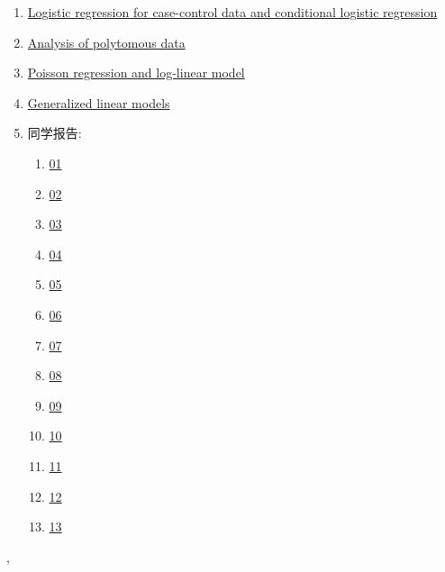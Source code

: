 \documentclass[11pt]{article}
\renewcommand{\today}{\shortmonthname[\the\month] \the \day,  \the\year}
\begin{document}
\begin{enumerate}
	\item \href{https://mp.weixin.qq.com/s/W159WsfV-EgqbGay22e_Wg}{Logistic regression for case-control data and conditional logistic regression}	%
	\item \href{https://mp.weixin.qq.com/s/Qba7J4eg6gLmx-U1O0EUIQ}{Analysis of polytomous data}	%
	\item \href{https://mp.weixin.qq.com/s/ml-xfUMtkioFPNJI30fetQ}{Poisson regression and log-linear model}	%
	\item \href{https://mp.weixin.qq.com/s/ak4rzd7MhRNk7PWp1WwxsQ}{Generalized linear models}	%
	\item 同学报告:
	\vspace{-0.25cm}
	\begin{multicols}{7}
		\begin{enumerate}
			\item \href{https://mp.weixin.qq.com/s/VcDztAmrOP3kR371QlMUSA}{01}	%
			\item \href{https://mp.weixin.qq.com/s/Ej1jEF-qKacFCb6EAX0JAw}{02}	%
			\item \href{https://mp.weixin.qq.com/s/MTZu1n6WEOYSGjZqnKPodA}{03}	%
			\item \href{https://mp.weixin.qq.com/s/Ovcd-0bm1ijOXPyn5OmmHA}{04}	%
			\item \href{https://mp.weixin.qq.com/s/-24IZomVKA39-PUP4fELzw}{05}	%
			\item \href{https://mp.weixin.qq.com/s/OtqAtzYVX52tU8JulqLOLg}{06}	%
			\item \href{https://mp.weixin.qq.com/s/zFdUWWkTQHKxXPqosTptiQ}{07}	%
			\item \href{https://mp.weixin.qq.com/s/5x1hvAFwDcBRaW_T0JtWRA}{08}	%
			\item \href{https://mp.weixin.qq.com/s/gD8t70nfqdGrRvid906S9w}{09}	%
			\item \href{https://mp.weixin.qq.com/s/hi5fUMEkMbduMCBG81RNDQ}{10}	%
			\item \href{https://mp.weixin.qq.com/s/q-NA91RBFrGiG51EqQgl7A}{11}	%
			\item \href{https://mp.weixin.qq.com/s/ok-oypG0TC-R1M1zVWQ2wg}{12}	%
			\item \href{https://mp.weixin.qq.com/s/TF1Ox4zLf9hw4BFer9TZDQ}{13}	%
		\end{enumerate}
	\end{multicols}
\end{enumerate}







%
\begin{flushright}
	\tiny \today 
\end{flushright}
\end{document}
